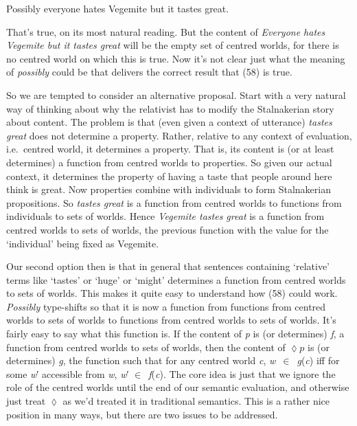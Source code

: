 \documentclass[
  10pt,
  letterpaper,
  DIV=11,
  numbers=noendperiod,
  twoside]{scrartcl}
\providecommand{\tightlist}{%
  \setlength{\itemsep}{0pt}\setlength{\parskip}{0pt}}\usepackage{longtable,booktabs,array}
\begin{document}
\begin{description}
\tightlist
\item[(58)]
Possibly everyone hates Vegemite but it tastes great.
\end{description}

That's true, on its most natural reading. But the content of
\emph{Everyone hates Vegemite but it tastes great} will be the empty set
of centred worlds, for there is no centred world on which this is true.
Now it's not clear just what the meaning of \emph{possibly} could be
that delivers the correct result that (58) is true.

So we are tempted to consider an alternative proposal. Start with a very
natural way of thinking about why the relativist has to modify the
Stalnakerian story about content. The problem is that (even given a
context of utterance) \emph{tastes great} does not determine a property.
Rather, relative to any context of evaluation, i.e.~centred world, it
determines a property. That is, its content is (or at least determines)
a function from centred worlds to properties. So given our actual
context, it determines the property of having a taste that people around
here think is great. Now properties combine with individuals to form
Stalnakerian propositions. So \emph{tastes great} is a function from
centred worlds to functions from individuals to sets of worlds. Hence
\emph{Vegemite tastes great} is a function from centred worlds to sets
of worlds, the previous function with the value for the `individual'
being fixed as Vegemite.

Our second option then is that in general that sentences containing
`relative' terms like `tastes' or `huge' or `might' determines a
function from centred worlds to sets of worlds. This makes it quite easy
to understand how (58) could work. \emph{Possibly} type-shifts so that
it is now a function from functions from centred worlds to sets of
worlds to functions from centred worlds to sets of worlds. It's fairly
easy to say what this function is. If the content of \emph{p} is (or
determines) \emph{f}, a function from centred worlds to sets of worlds,
then the content of \(\lozenge p\) is (or determines) \emph{g}, the
function such that for any centred world \emph{c},
\emph{w}~\({\in}\)~\emph{g}(\emph{c}) iff for some \emph{w}′ accessible
from \emph{w}, \emph{w}′ \({\in}\)~\emph{f}(\emph{c}). The core idea is
just that we ignore the role of the centred worlds until the end of our
semantic evaluation, and otherwise just treat \(\lozenge\) as we'd
treated it in traditional semantics. This is a rather nice position in
many ways, but there are two issues to be addressed.
\end{document}
